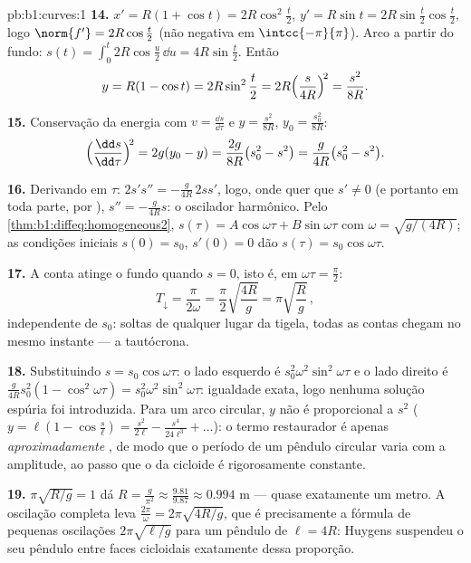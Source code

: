 \begin{solution}{pb:b1:curves:1}
\textbf{14.} $x' = R(1 + \cos t) = 2R\cos^2\frac t2$, $y' =
R\sin t = 2R\sin\frac t2\cos\frac t2$, logo $\norm{f'} =
2R\cos\frac t2$ (não negativa em $\intcc{-\pi}{\pi}$). Arco a
partir do fundo: $s(t) = \int_0^t 2R\cos\frac u2\,\dd u =
4R\sin\frac t2$. Então
\[
y = R(1 - \cos t) = 2R\sin^2\frac t2
= 2R\Bigl(\frac{s}{4R}\Bigr)^{\!2} = \frac{s^2}{8R} .
\]

\textbf{15.} Conservação da energia com $v = \frac{\dd s}{\dd\tau}$ e $y = \frac{s^2}{8R}$, $y_0 = \frac{s_0^2}{8R}$:
\[
\Bigl(\frac{\dd s}{\dd\tau}\Bigr)^{\!2} = 2g(y_0 - y)
= \frac{2g}{8R}\bigl(s_0^2 - s^2\bigr)
= \frac{g}{4R}\bigl(s_0^2 - s^2\bigr).
\]

\textbf{16.} Derivando em $\tau$: $2s's'' =
-\frac{g}{4R}\,2ss'$, logo, onde quer que $s' \neq 0$ (e
portanto em toda parte, por ), $s'' = -\frac{g}{4R}s$: o oscilador
harmônico. Pelo \cref{thm:b1:diffeq:homogeneous2}, $s(\tau) =
A\cos\omega\tau + B\sin\omega\tau$ com $\omega =
\sqrt{g/(4R)}$; as condições iniciais $s(0) = s_0$,
$s'(0) = 0$ dão $s(\tau) = s_0\cos\omega\tau$.

\textbf{17.} A conta atinge o fundo quando $s = 0$, isto é, em $\omega\tau = \frac\pi2$:
\[
T_{\downarrow} = \frac{\pi}{2\omega}
= \frac\pi2\sqrt{\frac{4R}{g}} = \pi\sqrt{\frac Rg}\,,
\]
independente de $s_0$: soltas de qualquer lugar da tigela, todas as
contas chegam no mesmo instante --- a tautócrona.

\textbf{18.} Substituindo $s = s_0\cos\omega\tau$: o lado esquerdo é $s_0^2\omega^2\sin^2\omega\tau$ e o lado
direito é $\frac{g}{4R}s_0^2(1 - \cos^2\omega\tau) =
s_0^2\omega^2\sin^2\omega\tau$: igualdade exata, logo nenhuma solução espúria foi
introduzida. Para um arco circular, $y$ não é proporcional a $s^2$
($y = \ell(1 - \cos\frac s\ell) =
\frac{s^2}{2\ell} - \frac{s^4}{24\ell^3} + \dots$): o termo restaurador é apenas \emph{aproximadamente} ,
de modo que o período de um pêndulo circular varia com a amplitude,
ao passo que o da cicloide é rigorosamente constante.

\textbf{19.} $\pi\sqrt{R/g} = 1$ dá $R = \frac{g}{\pi^2}
\approx \frac{9.81}{9.87} \approx 0.994$ m --- quase exatamente um metro. A
oscilação completa leva $\frac{2\pi}\omega =
2\pi\sqrt{4R/g}$, que é precisamente a fórmula de
pequenas oscilações $2\pi\sqrt{\ell/g}$ para um pêndulo de  $\ell = 4R$:
Huygens suspendeu o seu pêndulo entre faces cicloidais exatamente
dessa proporção.


\end{solution}
